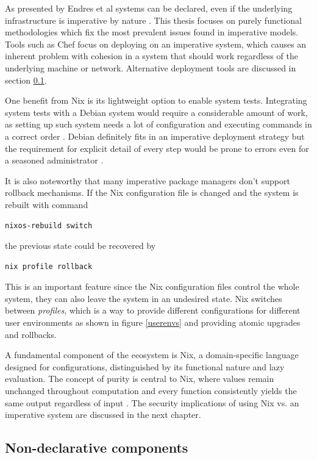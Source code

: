 As presented by Endres et al systems can be declared, even if the
underlying infrastructure is imperative by nature
\cite{endres2017declarative}. This thesis focuses on purely functional
methodologies which fix the most prevalent issues found in
imperative models. Tools such as Chef focus on deploying on an
imperative system, which causes an inherent problem with cohesion in a
system that should work regardless of the underlying machine or
network. Alternative deployment tools are discussed in section
\ref{nondeclarative}.

One benefit from Nix is its lightweight option to enable system
tests. Integrating system tests with a Debian system would require a
considerable amount of work, as setting up such system needs a lot of
configuration and executing commands in a correct order
\cite{van2010automating}. Debian definitely fits in an imperative
deployment strategy but the requirement for explicit detail of every
step would be prone to errors even for a seasoned administrator
\cite{breitenbucher2017declarative}.

It is also noteworthy that many imperative package managers don't
support rollback mechanisms. If the Nix configuration file is changed
and the system is rebuilt with command
\begin{lstlisting}
nixos-rebuild switch
\end{lstlisting}
the previous state could be recovered by
\begin{lstlisting}
nix profile rollback
\end{lstlisting}
This is an important feature since the Nix configuration files control
the whole system, they can also leave the system in an undesired
state. Nix switches between \textit{profiles}, which is a way to
provide different configurations for different user environments as
shown in figure \ref{userenvs} and providing atomic upgrades and
rollbacks. \cite{nixosNixOSManual}

A fundamental component of the ecosystem is Nix, a domain-specific
language designed for configurations, distinguished by its functional
nature and lazy evaluation. The concept of purity is central to Nix,
where values remain unchanged throughout computation and every
function consistently yields the same output regardless of input
\cite{dolstra2013charon}. The security implications of using Nix
vs. an imperative system are discussed in the next chapter.

\subsection{Non-declarative components} \label{nondeclarative}

